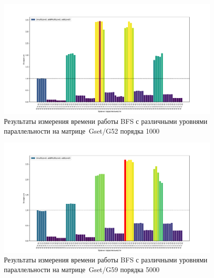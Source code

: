 \begin{landscape}
\begin{figure}
    \thispagestyle{empty} 
    \centering
    \includegraphics[height=0.8\textwidth]{figures/barPlot1000.pdf}
    \caption{Результаты измерения времени работы BFS с различными уровнями параллельности на мат\-ри\-це~Gset/G52 порядка 1000\\}
    \label{fig:barPlot1000}
\end{figure}
\end{landscape}

\begin{landscape}
\begin{figure}
    \thispagestyle{empty} 
    \centering
    \includegraphics[height=0.8\textwidth]{figures/barPlot5000.pdf}
    \caption{Результаты измерения времени работы BFS с различными уровнями параллельности на мат\-ри\-це~Gset/G59 порядка 5000\\}
    \label{fig:barPlot5000}
\end{figure}
\end{landscape}

